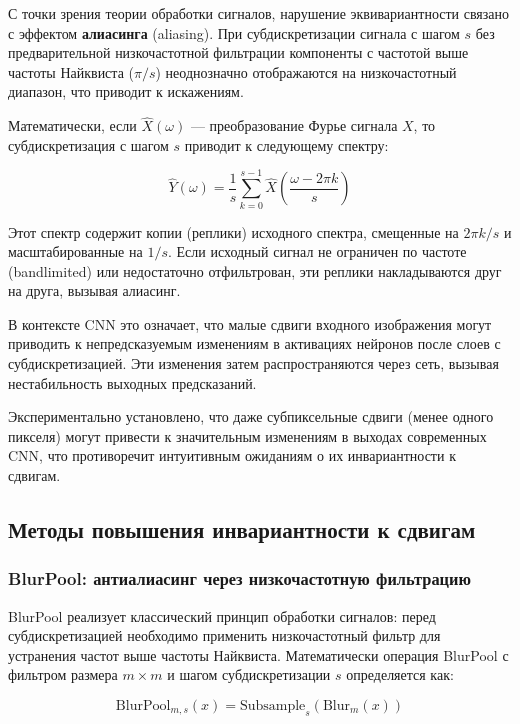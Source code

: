 С точки зрения теории обработки сигналов, нарушение эквивариантности связано с эффектом \textbf{алиасинга} (aliasing). При субдискретизации сигнала с шагом $s$ без предварительной низкочастотной фильтрации компоненты с частотой выше частоты Найквиста ($\pi/s$) неоднозначно отображаются на низкочастотный диапазон, что приводит к искажениям.

Математически, если $\hat{X}(\omega)$ — преобразование Фурье сигнала $X$, то субдискретизация с шагом $s$ приводит к следующему спектру:

\begin{equation}
\hat{Y}(\omega) = \frac{1}{s} \sum_{k=0}^{s-1} \hat{X}\left(\frac{\omega - 2\pi k}{s}\right)
\end{equation}

Этот спектр содержит копии (реплики) исходного спектра, смещенные на $2\pi k/s$ и масштабированные на $1/s$. Если исходный сигнал не ограничен по частоте (bandlimited) или недостаточно отфильтрован, эти реплики накладываются друг на друга, вызывая алиасинг.

В контексте CNN это означает, что малые сдвиги входного изображения могут приводить к непредсказуемым изменениям в активациях нейронов после слоев с субдискретизацией. Эти изменения затем распространяются через сеть, вызывая нестабильность выходных предсказаний.

Экспериментально установлено, что даже субпиксельные сдвиги (менее одного пикселя) могут привести к значительным изменениям в выходах современных CNN, что противоречит интуитивным ожиданиям о их инвариантности к сдвигам.

\subsection{Методы повышения инвариантности к сдвигам}
\label{sec:methods}

\subsubsection{BlurPool: антиалиасинг через низкочастотную фильтрацию}
\label{sec:methods:blurpool}

BlurPool реализует классический принцип обработки сигналов: перед субдискретизацией необходимо применить низкочастотный фильтр для устранения частот выше частоты Найквиста. Математически операция BlurPool с фильтром размера $m \times m$ и шагом субдискретизации $s$ определяется как:

\begin{equation}
\text{BlurPool}_{m,s}(x) = \text{Subsample}_{s}(\text{Blur}_{m}(x))
\end{equation}

